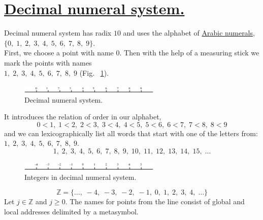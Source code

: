 \documentclass[color=black,11pt]{elegantpaper}
\begin{document}
\section{\href{https://en.wikipedia.org/wiki/Decimal}{Decimal numeral system.}}
Decimal numeral system has radix $10$ and uses the alphabet of \href{https://en.wikipedia.org/wiki/Arabic_numerals_(disambiguation)}{Arabic numerals},\\
 $\{0,\;1,\;2,\;3,\;4,\;5,\;6,\;7,\;8,\;9\}.$\\
 First, we choose a point  with name $0.$ Then with the help of a measuring stick we mark the points with names\\
 $1,\;2,\;3,\;4,\;5,\;6,\;7,\;8,\;9$ (Fig. ~\ref{fig:Decimal_start}).
\begin{figure}[htbp]
  \centering
  \includegraphics[width=0.6\textwidth]{xfig_stuff/Decimal_start.eps}
  \caption{Decimal numeral system.} 
  \label{fig:Decimal_start}
\end{figure}
It introduces the relation of order in our alphabet,
$$
0<1,\;1<2,\;2<3,\;3<4,\;4<5,\;5<6,\;6<7,\;7<8,\;8<9
$$
and we can lexicographically list all words that start with one of the letters from:\\
 $1,\;2,\;3,\;4,\;5,\;6,\;7,\;8,\;9.$
$$
1,\;2,\;3,\;4,\;5,\;6,\;7,\;8,\;9,\;10,\;11,\;12,\;13,\;14,\;15,\;\dots
$$  
\begin{figure}[htbp]
  \centering
  \includegraphics[width=0.6\textwidth]{xfig_stuff/Decimal_integers.eps}
  \caption{Integers in decimal numeral system.} 
  \label{fig:Decimal_integers}
\end{figure}
$$
\mathbb{Z}=\{\dots,\;-4,\;-3,\;-2,\;-1,\;0,\;1,\;2,\;3,\;4,\;\dots\}
$$
Let $j\in \mathbb{Z}$ and $j\ge 0.$
 The names for points from the line consist of global and local addresses delimited by a metasymbol.
\end{document}
